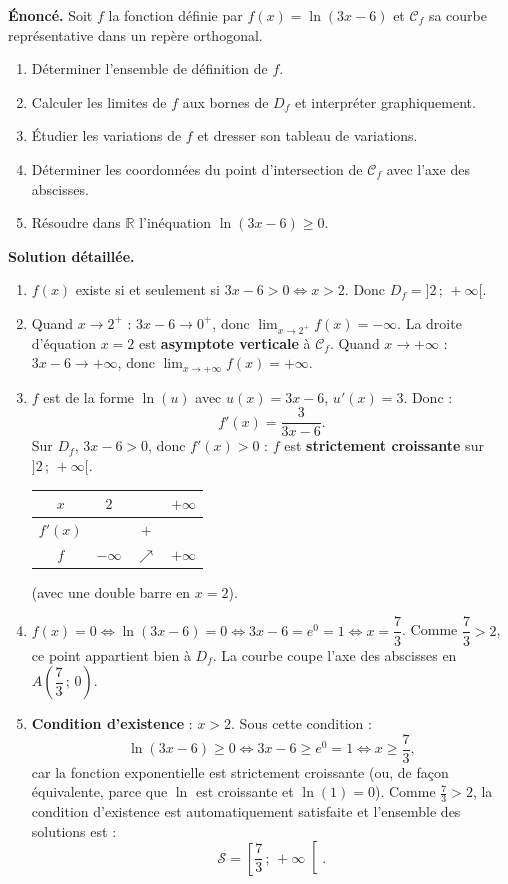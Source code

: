 \documentclass[11pt]{article}
\begin{document}
\begin{exoresolu}[Étude complète de f(x) = ln(3x - 6) et inéquation]
\textbf{Énoncé.} Soit $f$ la fonction définie par $f(x)=\ln(3x-6)$ et $\mathcal{C}_f$ sa courbe représentative dans un repère orthogonal.
\begin{enumerate}
\item Déterminer l'ensemble de définition de $f$.
\item Calculer les limites de $f$ aux bornes de $D_f$ et interpréter graphiquement.
\item Étudier les variations de $f$ et dresser son tableau de variations.
\item Déterminer les coordonnées du point d'intersection de $\mathcal{C}_f$ avec l'axe des abscisses.
\item Résoudre dans $\mathbb{R}$ l'inéquation $\ln(3x-6)\geq 0$.
\end{enumerate}
\tcblower
\textbf{Solution détaillée.}
\begin{enumerate}
\item $f(x)$ existe si et seulement si $3x-6>0 \iff x>2$. Donc $D_f=]2\,;\,+\infty[$.
\item Quand $x\to 2^+$ : $3x-6\to 0^+$, donc $\displaystyle\lim_{x\to 2^+}f(x)=-\infty$. La droite d'équation $x=2$ est \textbf{asymptote verticale} à $\mathcal{C}_f$. Quand $x\to+\infty$ : $3x-6\to+\infty$, donc $\displaystyle\lim_{x\to+\infty}f(x)=+\infty$.
\item $f$ est de la forme $\ln(u)$ avec $u(x)=3x-6$, $u'(x)=3$. Donc :
\[ f'(x)=\frac{3}{3x-6}. \]
Sur $D_f$, $3x-6>0$, donc $f'(x)>0$ : $f$ est \textbf{strictement croissante} sur $]2\,;\,+\infty[$.
\begin{center}
\begin{tabular}{|c|ccc|}
\hline
$x$ & $2$ & & $+\infty$ \\
\hline
$f'(x)$ & \multicolumn{3}{c|}{$+$} \\
\hline
$f$ & $-\infty$ & $\nearrow$ & $+\infty$ \\
\hline
\end{tabular}
\end{center}
(avec une double barre en $x=2$).
\item $f(x)=0 \iff \ln(3x-6)=0 \iff 3x-6=e^0=1 \iff x=\dfrac{7}{3}$. Comme $\dfrac{7}{3}>2$, ce point appartient bien à $D_f$. La courbe coupe l'axe des abscisses en $A\left(\dfrac{7}{3}\,;\,0\right)$.
\item \textbf{Condition d'existence} : $x>2$. Sous cette condition :
\[ \ln(3x-6)\geq 0 \iff 3x-6\geq e^0=1 \iff x\geq \frac{7}{3}, \]
car la fonction exponentielle est strictement croissante (ou, de façon équivalente, parce que $\ln$ est croissante et $\ln(1)=0$). Comme $\frac{7}{3}>2$, la condition d'existence est automatiquement satisfaite et l'ensemble des solutions est :
\[ \mathcal{S}=\left[\frac{7}{3}\,;\,+\infty\right[. \]
\end{enumerate}
\end{exoresolu}
\end{document}
